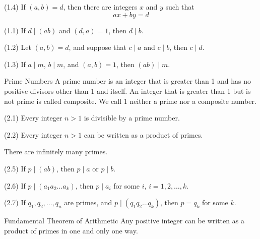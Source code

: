 \documentclass[12pt]{article}
\begin{document}
\begin{theorem}{(1.4)}{}
    If $ \left( a, b \right) = d $, then there are integers $ x $ and $ y $ such that
    \[ ax + by = d \]
\end{theorem}
\begin{corollary}{(1.1)}{}
    If $ d \mid \left( ab \right) $ and $ \left( d, a \right) = 1 $, then $ d \mid b $.
\end{corollary}
\begin{corollary}{(1.2)}{}
    Let $ \left( a, b \right) = d $, and suppose that $ c \mid a $ and $ c \mid b $, then $ c \mid d $.
\end{corollary}
\begin{corollary}{(1.3)}{}
    If $ a \mid m $, $ b \mid m $, and $ \left( a, b \right) = 1 $, then $ \left( ab \right) \mid m $.
\end{corollary}
\begin{definition}{Prime Numbers}{}
    A prime number is an integer that is greater than 1 and has no positive divisors other than 1 and itself. An integer that is greater than 1 but is not prime is called composite. We call 1 neither a prime nor a composite number.
\end{definition}
\begin{lemma}{(2.1)}{}
    Every integer $ n > 1 $ is divisible by a prime number.
\end{lemma}
\begin{lemma}{(2.2)}{}
    Every integer $ n > 1 $ can be written as a product of primes.
\end{lemma}
\begin{theorem}{}{}
    There are infinitely many primes.
\end{theorem}
\begin{lemma}{(2.5)}{}
    If $ p \mid \left( a b \right) $, then $ p \mid a $ or $ p \mid b $.
\end{lemma}
\begin{lemma}{(2.6)}{}
    If $ p \mid \left( a_1 a_2 \dots a_k \right) $, then $ p \mid a_i $ for some $ i $, $ i = 1, 2, \dots, k $.
\end{lemma}
\begin{lemma}{(2.7)}{}
    If $ q_1, q_2, \dots, q_n $ are primes, and $ p \mid \left( q_1 q_2 \dots q_k \right) $, then $ p = q_k $ for some $ k $.
\end{lemma}
\begin{theorem}{Fundamental Theorem of Arithmetic}{}
    Any positive integer can be written as a product of primes in one and only one way.
\end{theorem}
\end{document}
